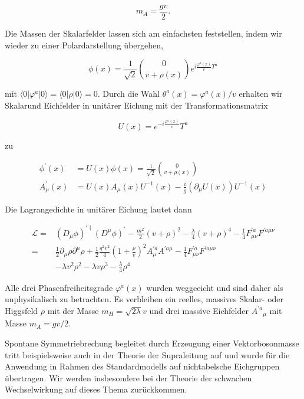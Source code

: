 \documentclass[10pt, letterpaper]{article}
\begin{document}
$$
m_{A}=\frac{g v}{2} .
$$

Die Massen der Skalarfelder lassen sich am einfachsten feststellen, indem wir wieder zu einer Polardarstellung übergehen,

$$
\phi(x)=\frac{1}{\sqrt{2}}\binom{0}{v+\rho(x)} e^{i \frac{\varphi^{a}(x)}{v} T^{a}}
$$

mit $\langle 0| \varphi^{a}|0\rangle=\langle 0| \rho|0\rangle=0$. Durch die Wahl $\theta^{a}(x)=\varphi^{a}(x) / v$ erhalten wir Skalarund Eichfelder in unitärer Eichung mit der Transformationsmatrix

$$
U(x)=e^{-i \frac{\varphi^{a}(x)}{v}} T^{a}
$$

zu

$$
\begin{aligned}
\phi^{\prime}(x) & =U(x) \phi(x)=\frac{1}{\sqrt{2}}\binom{0}{v+\rho(x)} \\
A_{\mu}^{\prime}(x) & =U(x) A_{\mu}(x) U^{-1}(x)-\frac{i}{g}\left(\partial_{\mu} U(x)\right) U^{-1}(x)
\end{aligned}
$$

Die Lagrangedichte in unitärer Eichung lautet dann

$$
\begin{aligned}
\mathscr{L}= & \left(D_{\mu} \phi\right)^{\prime \dagger}\left(D^{\mu} \phi\right)^{\prime}-\frac{m^{2}}{2}(v+\rho)^{2}-\frac{\lambda}{4}(v+\rho)^{4}-\frac{1}{4} F_{\mu \nu}^{\prime a} F^{\prime a \mu \nu} \\
= & \frac{1}{2} \partial_{\mu} \rho \partial^{\mu} \rho+\frac{1}{2} \frac{g^{2} v^{2}}{4}\left(1+\frac{\rho}{v}\right)^{2} A_{\mu}^{\prime a} A^{\prime a \mu}-\frac{1}{4} F_{\mu \nu}^{\prime a} F^{\prime a \mu \nu} \\
& -\lambda v^{2} \rho^{2}-\lambda v \rho^{3}-\frac{\lambda}{4} \rho^{4}
\end{aligned}
$$

Alle drei Phasenfreiheitsgrade $\varphi^{a}(x)$ wurden weggeeicht und sind daher als unphysikalisch zu betrachten. Es verbleiben ein reelles, massives Skalar- oder Higgsfeld $\rho$ mit der Masse $m_{H}=\sqrt{2 \lambda} v$ und drei massive Eichfelder $A^{\prime a}{ }_{\mu}$ mit Masse $m_{A}=g v / 2$.

Spontane Symmetriebrechung begleitet durch Erzeugung einer Vektorbosonmasse tritt beispielsweise auch in der Theorie der Supraleitung auf und wurde für die Anwendung in Rahmen des Standardmodells auf nichtabelsche Eichgruppen übertragen. Wir werden insbesondere bei der Theorie der schwachen Wechselwirkung auf dieses Thema zurückkommen.
\end{document}
